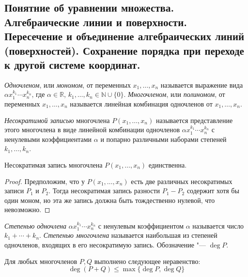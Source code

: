 \subsection{Понятние об уравнении множества. Алгебраические линии и поверхности. Пересечение и объединение алгебраических линий (поверхностей). Сохранение порядка при переходе к другой системе координат.}

    \begin{definition}
    	\textit{Одночленом}, или \textit{мономом}, от переменных $x_1, \dotsc, x_n$ называется выражение вида $\alpha x_1^{k_1} \dotsm x_n^{k_n}$, где $\alpha \in \mathbb{R}$, $k_1, \dotsc, k_n \in \mathbb{N} \cup \{0\}$. \textit{Многочленом}, или \textit{полиномом}, от переменных $x_1, \dotsc, x_n$ называется линейная комбинация одночленов от $x_1, \dotsc, x_n$.
    \end{definition}
    
    \begin{definition}
    	\textit{Несократимой записью} многочлена $P(x_1, \dotsc, x_n)$ называется представление этого многочлена в виде линейной комбинации одночленов $\alpha x_1^{k_1} \dotsm x_n^{k_n}$ с ненулевыми коэффициентами $\alpha$ и попарно различными наборами степеней $k_1, \dotsc, k_n$.
    \end{definition}
    
    \begin{corollary}
    	Несократимая запись многочлена $P(x_1, \dotsc, x_n)$ единственна.
    \end{corollary}
    
    \begin{proof}
    	Предположим, что у $P(x_1,\dots, x_n)$ есть две различных несократимых записи $P_1$ и $P_2$. Тогда несократимая запись разности $P_1 - P_2$ содержит хотя бы один моном, но эта же запись должна быть тождественно нулевой, что невозможно.
    \end{proof}
    
    \begin{definition}
    	\textit{Степенью одночлена} $\alpha x_1^{k_1} \dotsm x_n^{k_n}$ с ненулевым коэффициентом $\alpha$ называется число $k_1 + \dotsb + k_n$. \textit{Степенью многочлена} называется наибольшая из степеней одночленов, входящих в его несократимую запись. Обозначение "--- $\deg{P}$.
    \end{definition}
    
    \begin{proposition}
    	Для любых многочленов $P, Q$ выполнено следующее неравенство:
    	\[\deg{(P + Q)} \le \max\{\deg{P}, \deg{Q}\}\]
    \end{proposition}
    
